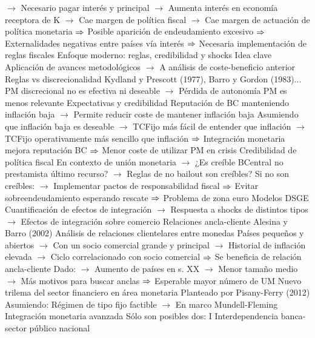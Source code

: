 \documentclass{nuevotema}
\begin{document}
\begin{esquemal}
				\4[] $\to$ Necesario pagar interés y principal
				\4[] $\to$ Aumenta interés en economía receptora de K
				\4[] $\to$ Cae margen de política fiscal
				\4[] $\to$ Cae margen de actuación de política monetaria
				\4[] $\Rightarrow$ Posible aparición de endeudamiento excesivo
				\4[] $\Rightarrow$ Externalidades negativas entre países vía interés
				\4[] $\Rightarrow$ Necesaria implementación de reglas fiscales
		\2 Enfoque moderno: reglas, credibilidad y shocks
			\3 Idea clave
				\4 Aplicación de avances metodológicos
				\4[] $\to$ A análisis de coste-beneficio anterior
			\3 Reglas vs discrecionalidad
				\4 Kydland y Prescott (1977), Barro y Gordon (1983)...
				\4[] PM discrecional no es efectiva ni deseable
				\4[] $\to$ Pérdida de autonomía PM es menos relevante
				\4 Expectativas y credibilidad
				\4[] Reputación de BC manteniendo inflación baja
				\4[] $\to$ Permite reducir coste de mantener inflación baja
				\4 Asumiendo que inflación baja es deseable
				\4[] $\to$ TCFijo más fácil de entender que inflación
				\4[] $\to$ TCFijo operativamente más sencillo que inflación
				\4[] $\Rightarrow$ Integración monetaria mejora reputación BC
				\4[] $\Rightarrow$ Menor coste de utilizar PM en crisis
				\4 Credibilidad de política fiscal
				\4[] En contexto de unión monetaria
				\4[] $\to$ ¿Es creíble BCentral no prestamista último recurso?
				\4[] $\to$ Reglas de no bailout son creíbles?
				\4[] Si no son creíbles:
				\4[] $\to$ Implementar pactos de responsabilidad fiscal
				\4[] $\Rightarrow$ Evitar sobreendeudamiento esperando rescate
				\4[] $\Rightarrow$ Problema de zona euro
			\3 Modelos DSGE
				\4[] Cuantificación de efectos de integración
				\4[] $\to$ Respuesta a shocks de distintos tipos
				\4[] $\to$ Efectos de integración sobre comercio
			\3 Relaciones ancla-cliente
				\4 Alesina y Barro (2002)
				\4 Análisis de relaciones clientelares entre monedas
				\4 Países pequeños y abiertos
				\4[] $\to$ Con un socio comercial grande y principal
				\4[] $\to$ Historial de inflación elevada
				\4[] $\to$ Ciclo correlacionado con socio comercial
				\4[] $\Rightarrow$ Se beneficia de relación ancla-cliente
				\4 Dado:
				\4[] $\to$ Aumento de países en s. XX
				\4[] $\to$ Menor tamaño medio
				\4[] $\to$ Más motivos para buscar anclas
				\4[] $\Rightarrow$ Esperable mayor número de UM
			\3 Nuevo trilema del sector financiero en área monetaria
				\4 Planteado por Pisany-Ferry (2012)
				\4 Asumiendo:
				\4[] Régimen de tipo fijo factible
				\4[] $\to$ En marco Mundell-Fleming
				\4[] Integración monetaria avanzada
				\4 Sólo son posibles dos:
				\4[] \textsc{I} Interdependencia banca-sector público nacional

\end{esquemal}
\end{document}

